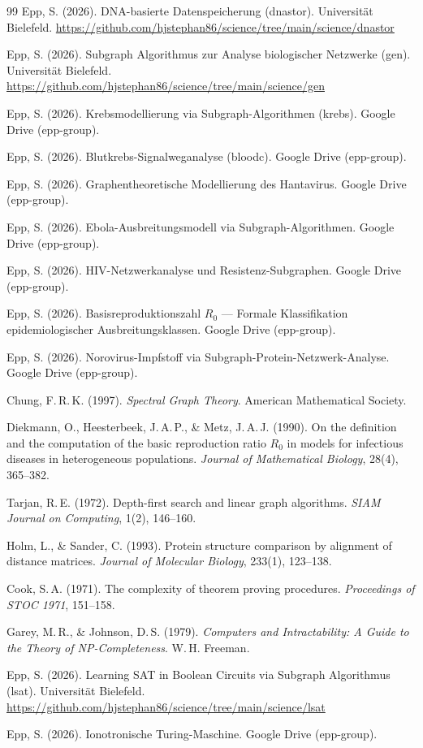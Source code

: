 ﻿\documentclass[a4paper,12pt]{article}
\theoremstyle{plain}
\theoremstyle{definition}
\theoremstyle{remark}
\begin{document}
\begin{thebibliography}{99}
Epp, S. (2026).
DNA-basierte Datenspeicherung (dnastor).
Universit\"at Bielefeld.
\url{https://github.com/hjstephan86/science/tree/main/science/dnastor}

Epp, S. (2026).
Subgraph Algorithmus zur Analyse biologischer Netzwerke (gen).
Universit\"at Bielefeld.
\url{https://github.com/hjstephan86/science/tree/main/science/gen}

Epp, S. (2026).
Krebsmodellierung via Subgraph-Algorithmen (krebs).
Google Drive (epp-group).

Epp, S. (2026).
Blutkrebs-Signalweganalyse (bloodc).
Google Drive (epp-group).

Epp, S. (2026).
Graphentheoretische Modellierung des Hantavirus.
Google Drive (epp-group).

Epp, S. (2026).
Ebola-Ausbreitungsmodell via Subgraph-Algorithmen.
Google Drive (epp-group).

Epp, S. (2026).
HIV-Netzwerkanalyse und Resistenz-Subgraphen.
Google Drive (epp-group).

Epp, S. (2026).
Basisreproduktionszahl $R_0$ ---
Formale Klassifikation epidemiologischer Ausbreitungsklassen.
Google Drive (epp-group).

Epp, S. (2026).
Norovirus-Impfstoff via Subgraph-Protein-Netzwerk-Analyse.
Google Drive (epp-group).

Chung, F.\,R.\,K. (1997).
\textit{Spectral Graph Theory}.
American Mathematical Society.

Diekmann, O., Heesterbeek, J.\,A.\,P., \& Metz, J.\,A.\,J. (1990).
On the definition and the computation of the basic reproduction ratio
$R_0$ in models for infectious diseases in heterogeneous populations.
\textit{Journal of Mathematical Biology}, 28(4), 365--382.

Tarjan, R.\,E. (1972).
Depth-first search and linear graph algorithms.
\textit{SIAM Journal on Computing}, 1(2), 146--160.

Holm, L., \& Sander, C. (1993).
Protein structure comparison by alignment of distance matrices.
\textit{Journal of Molecular Biology}, 233(1), 123--138.

Cook, S.\,A. (1971).
The complexity of theorem proving procedures.
\textit{Proceedings of STOC 1971}, 151--158.

Garey, M.\,R., \& Johnson, D.\,S. (1979).
\textit{Computers and Intractability: A Guide to the Theory of NP-Completeness}.
W.\,H. Freeman.

Epp, S. (2026).
Learning SAT in Boolean Circuits via Subgraph Algorithmus (lsat).
Universit\"at Bielefeld.
\url{https://github.com/hjstephan86/science/tree/main/science/lsat}

Epp, S. (2026).
Ionotronische Turing-Maschine.
Google Drive (epp-group).

\end{thebibliography}
\end{document}
